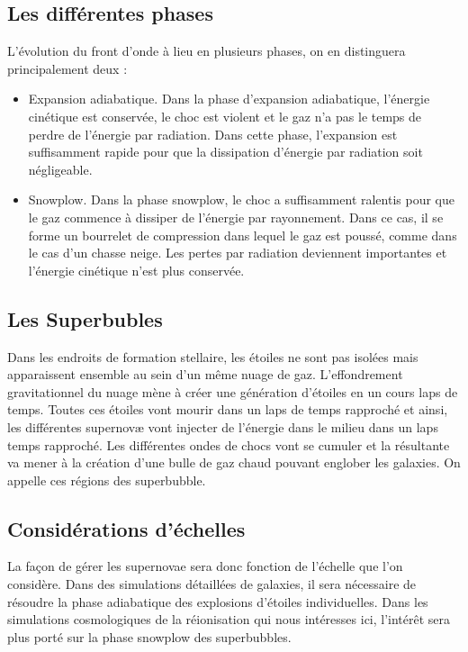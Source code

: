 \subsection{Les différentes phases}
L'évolution du front d'onde à lieu en plusieurs phases, on en distinguera principalement deux : 

\begin{itemize}
\item Expansion adiabatique.
Dans la phase d'expansion adiabatique, l'énergie cinétique est conservée, le choc est violent et le gaz n'a pas le temps de perdre de l'énergie par radiation.
Dans cette phase, l'expansion est suffisamment rapide pour que la dissipation d'énergie par radiation soit négligeable.

\item Snowplow.
Dans la phase snowplow, le choc a suffisamment ralentis pour que le gaz commence à dissiper de l'énergie par rayonnement.
Dans ce cas, il se forme un bourrelet de compression dans lequel le gaz est poussé, comme dans le cas d'un chasse neige. 
Les pertes par radiation deviennent importantes et l'énergie cinétique n'est plus conservée.
\end{itemize}

\subsection{Les Superbubles}

Dans les endroits de formation stellaire, les étoiles ne sont pas isolées mais apparaissent ensemble au sein d'un même nuage de gaz.
L'effondrement gravitationnel du nuage mène à créer une génération d’étoiles en un cours laps de temps.
Toutes ces étoiles vont mourir dans un laps de temps rapproché et ainsi, les différentes supernovæ vont injecter de l’énergie dans le milieu dans un laps temps rapproché.
Les différentes ondes de chocs vont se cumuler et la résultante va mener à la création d'une bulle de gaz chaud pouvant englober les galaxies.
On appelle ces régions des  superbubble.

\subsection{Considérations d'échelles}
La façon de gérer les supernovae sera donc fonction de l'échelle que l'on considère.
Dans des simulations détaillées de galaxies, il sera nécessaire de résoudre la phase adiabatique des explosions d'étoiles individuelles. %
Dans les simulations cosmologiques de la réionisation qui nous intéresses ici, l’intérêt sera plus porté sur la phase snowplow des superbubbles.

